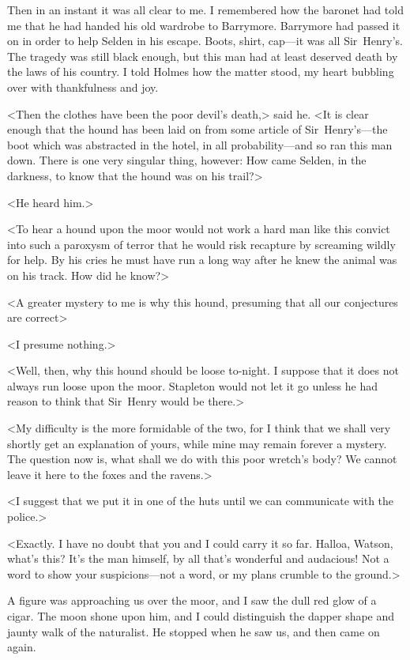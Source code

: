 Then in an instant it was all clear to me. I remembered how the baronet had told me that he had handed his old wardrobe to Barrymore. Barrymore had passed it on in order to help Selden in his escape. Boots, shirt, cap—it was all Sir~Henry's. The tragedy was still black enough, but this man had at least deserved death by the laws of his country. I told Holmes how the matter stood, my heart bubbling over with thankfulness and joy.

<Then the clothes have been the poor devil's death,> said he. <It is clear enough that the hound has been laid on from some article of Sir~Henry's—the boot which was abstracted in the hotel, in all probability—and so ran this man down. There is one very singular thing, however: How came Selden, in the darkness, to know that the hound was on his trail?>

<He heard him.>

<To hear a hound upon the moor would not work a hard man like this convict into such a paroxysm of terror that he would risk recapture by screaming wildly for help. By his cries he must have run a long way after he knew the animal was on his track. How did he know?>

<A greater mystery to me is why this hound, presuming that all our conjectures are correct\longdash>

<I presume nothing.>

<Well, then, why this hound should be loose to-night. I suppose that it does not always run loose upon the moor. Stapleton would not let it go unless he had reason to think that Sir~Henry would be there.>

<My difficulty is the more formidable of the two, for I think that we shall very shortly get an explanation of yours, while mine may remain forever a mystery. The question now is, what shall we do with this poor wretch's body? We cannot leave it here to the foxes and the ravens.>

<I suggest that we put it in one of the huts until we can communicate with the police.>

<Exactly. I have no doubt that you and I could carry it so far. Halloa, Watson, what's this? It's the man himself, by all that's wonderful and audacious! Not a word to show your suspicions—not a word, or my plans crumble to the ground.>

A figure was approaching us over the moor, and I saw the dull red glow of a cigar. The moon shone upon him, and I could distinguish the dapper shape and jaunty walk of the naturalist. He stopped when he saw us, and then came on again.

